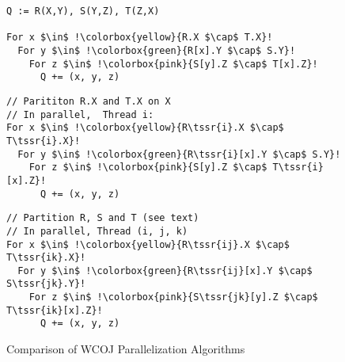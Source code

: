 \begin{figure*}[t]
  \setlistingalphabet
  \begin{minipage}[t]{.31\textwidth}
    
    
    
    \begin{lstlisting}[caption={Original Query}, style=BashInputStyle,
    lineskip=0pt,
    abovecaptionskip=0pt,
    label=lst:serial]
Q := R(X,Y), S(Y,Z), T(Z,X)

For x $\in$ !\colorbox{yellow}{R.X $\cap$ T.X}!
  For y $\in$ !\colorbox{green}{R[x].Y $\cap$ S.Y}!
    For z $\in$ !\colorbox{pink}{S[y].Z $\cap$ T[x].Z}!
      Q += (x, y, z)
\end{lstlisting}
   
  \end{minipage}
  \hfill
  \begin{minipage}[t]{.34\textwidth}
    \begin{lstlisting}[caption={Traditional Parallelization}, style=BashInputStyle,
    lineskip=-1pt,
    abovecaptionskip=0pt,
    label=lst:tradpara]  
// Parititon R.X and T.X on X
// In parallel,  Thread i:
For x $\in$ !\colorbox{yellow}{R\tssr{i}.X $\cap$ T\tssr{i}.X}!
  For y $\in$ !\colorbox{green}{R\tssr{i}[x].Y $\cap$ S.Y}!
    For z $\in$ !\colorbox{pink}{S[y].Z $\cap$ T\tssr{i}[x].Z}!
      Q += (x, y, z)
    \end{lstlisting}
    
  \end{minipage}
  \hfill
  \begin{minipage}[t]{.34\textwidth}
    \begin{lstlisting}[caption={\name's Parallelization}, style=BashInputStyle,
    lineskip=-1pt,
    abovecaptionskip=0pt,
    label=lst:newpara]  
// Partition R, S and T (see text)
// In parallel, Thread (i, j, k) 
For x $\in$ !\colorbox{yellow}{R\tssr{ij}.X $\cap$ T\tssr{ik}.X}!
  For y $\in$ !\colorbox{green}{R\tssr{ij}[x].Y $\cap$ S\tssr{jk}.Y}!
    For z $\in$ !\colorbox{pink}{S\tssr{jk}[y].Z $\cap$ T\tssr{ik}[x].Z}!
      Q += (x, y, z)
    \end{lstlisting}
    
  \end{minipage}

  
  
\caption{Comparison of WCOJ Parallelization Algorithms}
\label{fig:algo-comp}
  
  

\setlistingnumbering
\end{figure*}

